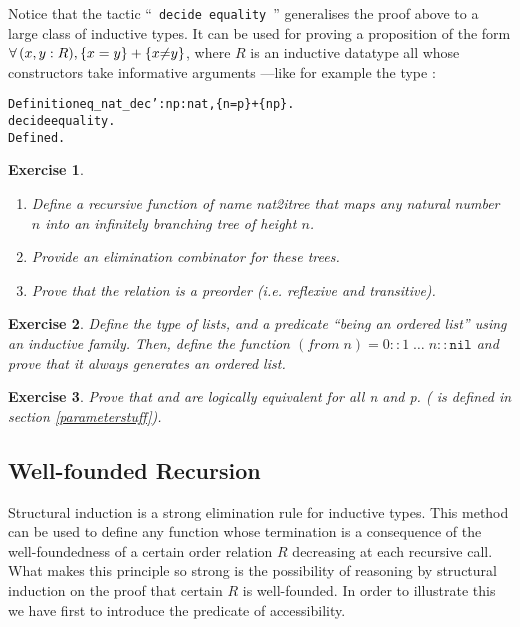 \documentclass[11pt]{article}
\newcommand{\refmancite}[1]{{}}
\newtheorem{exercise}{Exercise}[section]
\begin{document}
Notice that the tactic ``~\texttt{decide equality}~''
\refmancite{Section\ref{DecideEquality}} generalises the proof
above to a large class of inductive types.  It can be used for proving
a proposition of the form
$\forall\,(x,y:R),\{x=y\}+\{x{\mbox{$\neq$}}y\}$, where $R$ is an inductive datatype
all whose constructors take informative arguments ---like for example
the type {\nat}:

\begin{alltt}
Definition eq_nat_dec' : {\prodsym} n p:nat, \{n=p\} + \{n{\coqdiff}p\}.
 decide equality.
Defined.
\end{alltt}

\begin{exercise}
\begin{enumerate}
\item Define a recursive  function of name \emph{nat2itree}
that maps any natural number $n$ into an infinitely branching
tree of height $n$.
\item Provide an elimination combinator for these trees.
\item Prove that the relation  is a preorder
(i.e. reflexive and transitive).
\end{enumerate}
\end{exercise}

\begin{exercise} \label{zeroton}
Define the type of lists, and a predicate ``being an ordered list''
using an inductive family. Then, define the function
$(from\;n)=0::1\;\ldots\; n::\texttt{nil}$ and prove that it always generates an
ordered list.
\end{exercise}

\begin{exercise}
Prove that  and  are logically equivalent
for all n and p. ( is defined in section \ref{parameterstuff}).
\end{exercise}


\subsection{Well-founded Recursion}
\label{WellFoundedRecursion}

Structural induction is a strong elimination rule for inductive types.
This method can be used to define any function whose termination is
a consequence of the well-foundedness of a certain order relation $R$ decreasing
at each recursive call. What makes this principle so strong is the
possibility of reasoning by structural induction on the proof that
certain $R$ is well-founded.  In order to illustrate this we have
first to introduce the predicate of accessibility.
\end{document}
